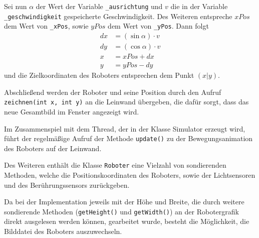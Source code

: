 \documentclass[paper=a4, DIV=calc, BCOR=12mm, twoside=on, onecolumn=on, open = right, titlepage =on, parskip =half-, headsepline = on, footsepline = off, chapterprefix = off, appendixprefix = on, fontsize = 12pt, numbers = noenddot, abstract = on]{scrbook}
\begin{document}
Sei nun $\alpha$ der Wert der Variable \texttt{{\_}ausrichtung} und $v$ die in der Variable \texttt{{\_}ge\-schwin\-dig\-keit} gespeicherte Geschwindigkeit. Des Weiteren entspreche $xPos$ dem Wert von \texttt{{\_}xPos}, sowie $yPos$ dem Wert von \texttt{{\_}yPos}. Dann folgt
\begin{align*}
dx & = \left( \sin \alpha \right) \cdot v\\
dy & = \left( \cos \alpha \right) \cdot v\\
x & = xPos + dx\\
y & = yPos - dy
\end{align*}
und die Zielkoordinaten des Roboters entsprechen dem Punkt $\left( x \vert y \right)$.

Abschließend werden der Roboter und seine Position durch den Aufruf \texttt{zeich\-nen(int x, int y)} an die Leinwand übergeben, die dafür sorgt, dass das neue Gesamtbild im Fenster angezeigt wird.

Im Zusammenspiel mit dem Thread, der in der Klasse Simulator erzeugt wird, führt der regelmäßige Aufruf der Methode \texttt{update()} zu der Bewegungsanimation des Roboters auf der Leinwand.


Des Weiteren enthält die Klasse \texttt{Roboter} eine Vielzahl von sondierenden Methoden, welche die Positionskoordinaten des Roboters, sowie der Lichtsensoren und des Berührungssensors zurückgeben.

Da bei der Implementation jeweils mit der Höhe und Breite, die durch weitere sondierende Methoden (\texttt{getHeight()} und \texttt{getWidth()}) an der Robotergrafik direkt ausgelesen werden können, gearbeitet wurde, besteht die Möglichkeit, die Bilddatei des Roboters auszuwechseln.
\end{document}
